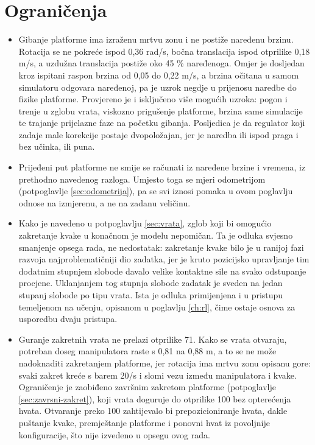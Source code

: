 \section{Ograničenja}
\label{sec:klasicni-limits}

\begin{itemize}
      \item Gibanje platforme ima izraženu mrtvu zonu i ne postiže naređenu brzinu. Rotacija se
            ne pokreće ispod 0,36 rad/s, bočna translacija ispod otprilike 0,18 m/s, a uzdužna
            translacija postiže oko 45 \% naređenoga. Omjer je dosljedan kroz ispitani raspon
            brzina od 0,05 do 0,22 m/s, a brzina očitana u samom simulatoru odgovara naređenoj, pa
            je uzrok negdje u prijenosu naredbe do fizike platforme. Provjereno je i isključeno
            više mogućih uzroka: pogon i trenje u zglobu vrata, viskozno prigušenje platforme,
            brzina same simulacije te trajanje prijelazne faze na početku gibanja.
            Posljedica je da regulator koji zadaje male korekcije postaje dvopoložajan, jer je
            naredba ili ispod praga i bez učinka, ili puna.

      \item Prijeđeni put platforme ne smije se računati iz naređene brzine i vremena, iz
            prethodno navedenog razloga. Umjesto toga se mjeri odometrijom (potpoglavlje
            \ref{sec:odometrija}), pa se svi iznosi pomaka u ovom poglavlju odnose na izmjerenu,
            a ne na zadanu veličinu.

      \item Kako je navedeno u potpoglavlju \ref{sec:vrata}, zglob koji bi omogućio zakretanje
            kvake u konačnom je modelu nepomičan. Ta je odluka svjesno smanjenje opsega rada, ne
            nedostatak: zakretanje kvake bilo je u ranijoj fazi razvoja najproblematičniji dio
            zadatka, jer je kruto pozicijsko upravljanje tim dodatnim stupnjem slobode davalo
            velike kontaktne sile na svako odstupanje procjene. Uklanjanjem tog stupnja slobode
            zadatak je sveden na jedan stupanj slobode po tipu vrata. Ista je odluka primijenjena
            i u pristupu temeljenom na učenju, opisanom u poglavlju \ref{ch:rl}, čime ostaje
            osnova za usporedbu dvaju pristupa.

      \item Guranje zakretnih vrata ne prelazi otprilike 71\textdegree{}. Kako se vrata otvaraju,
            potreban doseg manipulatora raste s 0,81 na 0,88 m, a to se ne može nadoknaditi
            zakretanjem platforme, jer rotacija ima mrtvu zonu opisanu gore: svaki zakret kreće s
            barem 20\textdegree{}/s i slomi vezu između manipulatora i kvake. Ograničenje je
            zaobiđeno završnim zakretom platforme (potpoglavlje \ref{sec:zavrsni-zakret}),
            koji vrata doguruje do otprilike 100\textdegree{} bez opterećenja hvata.
            Otvaranje preko 100\textdegree{} zahtijevalo bi prepozicioniranje hvata, dakle
            puštanje kvake, premještanje platforme i ponovni hvat iz povoljnije konfiguracije, što
            nije izvedeno u opsegu ovog rada.


\end{itemize}
